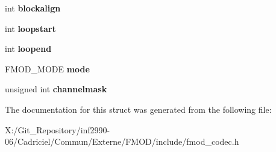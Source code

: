 \begin{DoxyCompactItemize}
\item 
\hypertarget{struct_f_m_o_d___c_o_d_e_c___w_a_v_e_f_o_r_m_a_t_a46df2a2789c6c438cd773762ed397a6f}{int {\bfseries blockalign}}\label{struct_f_m_o_d___c_o_d_e_c___w_a_v_e_f_o_r_m_a_t_a46df2a2789c6c438cd773762ed397a6f}

\item 
\hypertarget{struct_f_m_o_d___c_o_d_e_c___w_a_v_e_f_o_r_m_a_t_ae795e36327ba4772301f09501b2a8cc0}{int {\bfseries loopstart}}\label{struct_f_m_o_d___c_o_d_e_c___w_a_v_e_f_o_r_m_a_t_ae795e36327ba4772301f09501b2a8cc0}

\item 
\hypertarget{struct_f_m_o_d___c_o_d_e_c___w_a_v_e_f_o_r_m_a_t_af6fe45ead433ef4bdb8d3e74859900f2}{int {\bfseries loopend}}\label{struct_f_m_o_d___c_o_d_e_c___w_a_v_e_f_o_r_m_a_t_af6fe45ead433ef4bdb8d3e74859900f2}

\item 
\hypertarget{struct_f_m_o_d___c_o_d_e_c___w_a_v_e_f_o_r_m_a_t_a1f23ba212c380e08e9d0b83f16a00320}{F\-M\-O\-D\-\_\-\-M\-O\-D\-E {\bfseries mode}}\label{struct_f_m_o_d___c_o_d_e_c___w_a_v_e_f_o_r_m_a_t_a1f23ba212c380e08e9d0b83f16a00320}

\item 
\hypertarget{struct_f_m_o_d___c_o_d_e_c___w_a_v_e_f_o_r_m_a_t_aced974dac899dfe17cc5299453904281}{unsigned int {\bfseries channelmask}}\label{struct_f_m_o_d___c_o_d_e_c___w_a_v_e_f_o_r_m_a_t_aced974dac899dfe17cc5299453904281}

\end{DoxyCompactItemize}


The documentation for this struct was generated from the following file\-:\begin{DoxyCompactItemize}
\item 
X\-:/\-Git\-\_\-\-Repository/inf2990-\/06/\-Cadriciel/\-Commun/\-Externe/\-F\-M\-O\-D/include/fmod\-\_\-codec.\-h\end{DoxyCompactItemize}
